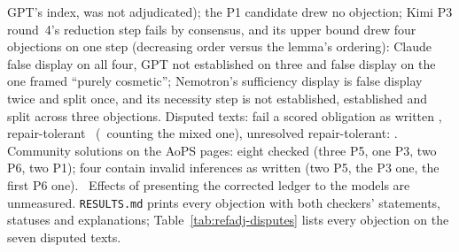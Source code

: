 GPT's index, was not adjudicated); the P1 candidate drew no objection; Kimi P3 round~4's reduction step fails by consensus, and its upper bound drew four objections on one step (decreasing order versus the lemma's ordering): Claude false display on all four, GPT not established on three and false display on the one framed ``purely cosmetic''; Nemotron's sufficiency display is false display twice and split once, and its necessity step is not established, established and split across three objections. Disputed texts: fail a scored obligation as written \REFADJDISPFAILAW, repair-tolerant \REFADJDISPFAILRT\ (\REFADJDISPFAILRTSTRICT\ counting the mixed one), unresolved repair-tolerant: \REFADJDISPUNRESRT. Community solutions on the AoPS pages: eight checked (three P5, one P3, two P6, two P1); four contain invalid inferences as written (two P5, the P3 one, the first P6 one). \REFADJLEDGERTXT\ Effects of presenting the corrected ledger to the models are unmeasured. \texttt{RESULTS.md} prints every objection with both checkers' statements, statuses and explanations; Table~\ref{tab:refadj-disputes} lists every objection on the seven disputed texts.

\begin{table}[htbp]\centering\scriptsize\setlength{\tabcolsep}{3pt}
\caption{Same ledger statement, different presentations of the same defect (statuses as written; every objection on the seven disputed texts, both checkers and repair sizes: Appendix Table~\ref{tab:refadj-disputes}).}
\label{tab:refadj-example}
\end{table}

